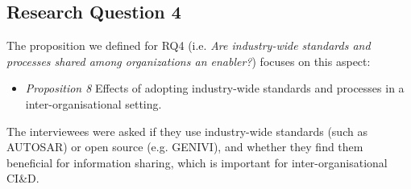 
\subsection{Research Question 4}\label{sec:ResearchQuestion4}

The proposition we defined for  
RQ4 (i.e. {\em Are industry-wide standards and processes shared among organizations an enabler?}) focuses on this aspect: %

\begin{itemize}
\item \emph{Proposition 8}{ Effects of adopting industry-wide standards and processes in a inter-organisational setting}.%
\end{itemize}



The interviewees were asked if they use industry-wide standards (such as AUTOSAR) or open source (e.g. GENIVI), and whether they find them beneficial for information sharing, which is important for inter-organisational CI\&D. 

